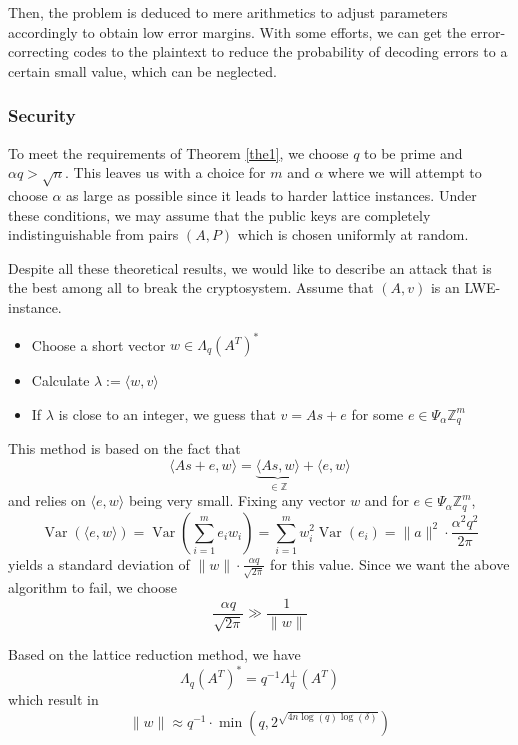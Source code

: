 Then, the problem is deduced to mere arithmetics to adjust parameters accordingly to obtain low error margins. With some efforts, we can get the error-correcting codes to the plaintext to reduce the probability of decoding errors to a certain small value, which can be neglected.

\subsubsection{Security}

To meet the requirements of Theorem \ref{the1}, we choose $q$ to be prime and $\alpha q>\sqrt{n}$. This leaves us with a choice for $m$ and $\alpha$ where we will attempt to choose $\alpha$ as large as possible since it leads to harder lattice instances. Under these conditions, we may assume that the public keys are completely indistinguishable from pairs $(A, P)$ which is chosen uniformly at random. 

Despite all these theoretical results, we would like to describe an attack that is the best among all to break the cryptosystem. Assume that $(A, v)$ is an LWE-instance.

\begin{itemize}
    \item Choose a short vector $w \in \Lambda_{q}\left(A^{T}\right)^{*}$
    \item Calculate $\lambda :=\langle w, v\rangle$
    \item If $\lambda$ is close to an integer, we guess that $v=A s+e$ for some $e \in \Psi_{\alpha} \mathbb{Z}_{q}^{m}$
\end{itemize}

This method is based on the fact that 
$$\langle A s+e, w\rangle=\underbrace{\langle A s, w\rangle}_{\in \mathbb{Z}}+\langle e, w\rangle$$
and relies on $\langle e, w\rangle$ being very small. Fixing any vector $w$ and for $e \in \Psi_{\alpha} \mathbb{Z}_{q}^{m}$,
$$\operatorname{Var}(\langle e, w\rangle)=\operatorname{Var}\left(\sum_{i=1}^{m} e_{i} w_{i}\right)=\sum_{i=1}^{m} w_{i}^{2} \operatorname{Var}\left(e_{i}\right)=\|a\|^{2} \cdot \frac{\alpha^{2} q^{2}}{2 \pi}$$
yields a standard deviation of $\|w\| \cdot \frac{\alpha q}{\sqrt{2 \pi}}$ for this value. Since we want the above algorithm to fail, we choose
\begin{equation}
    \frac{\alpha q}{\sqrt{2 \pi}} \gg \frac{1}{\|w\|}\label{eq3}
\end{equation}

Based on the lattice reduction method, we have 
$$\Lambda_{q}\left(A^{T}\right)^{*}=q^{-1} \Lambda_{q}^{\perp}\left(A^{T}\right)$$
which result in
$$\|w\| \approx q^{-1} \cdot \min \left(q, 2^{\sqrt{4 n \log (q) \log (\delta)}}\right)$$


